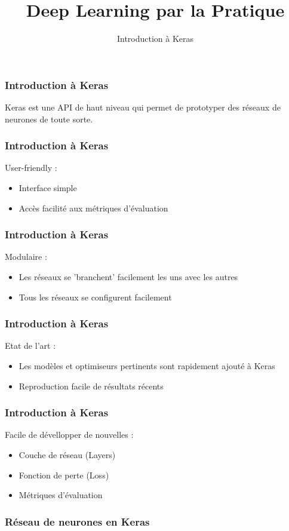 \documentclass{formation}
\title{Deep Learning par la Pratique}
\subtitle{Introduction à Keras}
\begin{document}
\maketitle

\begin{frame}
  \frametitle{Introduction à Keras}
  Keras est une API de haut niveau qui permet de prototyper des réseaux de neurones de toute sorte.
\end{frame}

\begin{frame}
  \frametitle{Introduction à Keras}
  User-friendly :
  \begin{itemize}
  \item Interface simple
  \item Accès facilité aux métriques d'évaluation
  \end{itemize}
\end{frame}

\begin{frame}
  \frametitle{Introduction à Keras}
  Modulaire :
  \begin{itemize}
  \item Les réseaux se 'branchent' facilement les uns avec les autres
  \item Tous les réseaux se configurent facilement
  \end{itemize}
\end{frame}

\begin{frame}
  \frametitle{Introduction à Keras}
  Etat de l'art :
  \begin{itemize}
  \item Les modèles et optimiseurs pertinents sont rapidement ajouté à Keras
  \item Reproduction facile de résultats récents
  \end{itemize}
\end{frame}

\begin{frame}
  \frametitle{Introduction à Keras}
  Facile de dévellopper de nouvelles :
  \begin{itemize}
  \item Couche de réseau (Layers)
  \item Fonction de perte (Loss)
  \item Métriques d'évaluation
  \end{itemize}
\end{frame}

\begin{frame}
  \frametitle{Réseau de neurones en Keras}
  \inputminted[linenos,fontsize=\small,bgcolor=pythonbg]{python}{code-illustration/tf-keras-mlp.py}
\end{frame}
\end{document}
